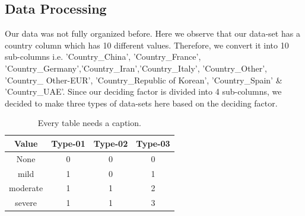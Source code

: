 \documentclass[letterpaper,11pt]{article}
\begin{document}
\subsection{Data Processing}

\noindent
Our data was not fully organized before. Here we observe that our data-set has a country column which has 10 different values. Therefore, we convert it into 10 sub-columns i.e. 'Country{\_}China', 'Country{\_}France', 'Country{\_}Germany','Country{\_}Iran','Country{\_}Italy', 'Country{\_}Other', 'Country{\_} Other-EUR', 'Country{\_}Republic of Korean', 'Country{\_}Spain' & 'Country{\_}UAE'.
Since our deciding factor is divided into 4 sub-columns, we decided to make three types of data-sets here based on the deciding factor. 





\begin{table}[ht]
\begin{center}
\caption{Every table needs a caption.}
\label{table1} 
\begin{tabular}{cccc} 
\hline
\multicolumn{1}{c}{Value} & \multicolumn{1}{c}{Type-01} & \multicolumn{1}{c}{Type-02}& \multicolumn{1}{c}{Type-03}\\
\hline
None     &   0 &   0 &   0 \\
mild     &   1 &   0 &   1 \\
moderate &   1 &   1 &   2 \\
severe   &   1 &   1 &   3 \\
\hline
\end{tabular}
\end{center}
\end{table}
\end{document}
